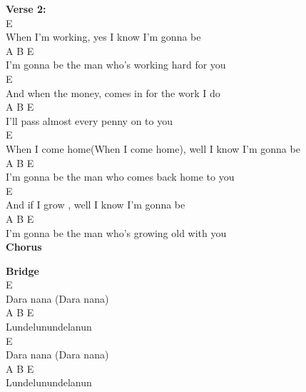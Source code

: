 \documentclass[a4paper]{article}
\begin{document}
{{        }
        \textbf{Verse 2:}
        ~\\
        {
            \cutive
            \obeyspaces
E
\\
When I'm working, yes I know I'm gonna be
\\
          A                B              E
\\
I'm gonna be the man who's working hard for you
\\
E
\\
And when the money, comes in for the work I do
\\
            A             B         E
\\
I'll pass almost every penny on to you
\\
E
\\
When I come home(When I come home), well I know I'm gonna be
\\
          A              B                  E
\\
I'm gonna be the man who comes back home to you
\\
E
\\
And if I grow , well I know I'm gonna be
\\
          A                B                E
\\
I'm gonna be the man who's growing old with you
\\

        }
        \textbf{Chorus}
        ~\\
        {
            \cutive
            \obeyspaces

        }
        \textbf{Bridge}
        ~\\
        {
            \cutive
            \obeyspaces
E
\\
Dara nana (Dara nana)
\\
A       B       E
\\
Lundelunundelanun
\\
E
\\
Dara nana (Dara nana)
\\
A       B       E
\\
Lundelunundelanun
\\

}}
\end{document}
